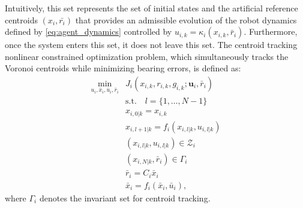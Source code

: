 Intuitively, this set represents the set of initial states and the artificial reference centroids $(x_i, \bar{r_i})$ that provides an admissible evolution of the robot dynamics defined by \eqref{eq:agent_dynamics} controlled by $u_{i,k} = \kappa_i(x_{i,k}, \bar{r}_i)$. Furthermore, once the system enters this set, it does not leave this set. The centroid tracking nonlinear constrained optimization problem, which simultaneously tracks the Voronoi centroids while minimizing bearing errors, is defined as:
\begin{subequations}
\label{eq:mpc}
\begin{align}
    \min_{u_i, \bar{x}_i, \bar{u}_i, \bar{r}_i} &J_i(x_{i,k}, r_{i,k}, g_{i,k}; \mathbf{u}_i, \bar{r}_i)\\
    &\text{s.t.} \quad l = \{1,\dots, N-1\}\\
    &x_{i,0|k} = x_{i,k}\\
    &x_{i,l+1|k} = f_i(x_{i,l|k}, u_{i,l|k})\\
    &(x_{i,l|k}, u_{i,l|k}) \in \mathcal{Z}_i\\
    &(x_{i,N|k}, \bar{r}_{i}) \in \Gamma_i\\
    &\bar{r}_i = C_i\bar{x}_i\\
    &\bar{x}_i = f_i(\bar{x}_i, \bar{u}_i),
\end{align}
\end{subequations}
where $\Gamma_i$ denotes the invariant set for centroid tracking.

